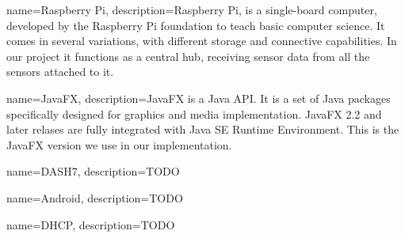 \documentclass[../document]{subfiles}
\begin{document}
{
   name=Raspberry Pi,
   description={Raspberry Pi, is a single-board computer, developed by the Raspberry Pi foundation to teach basic computer science. It comes in several variations, with different storage and connective capabilities. In our project it functions as a central hub, receiving sensor data from all the sensors attached to it.}
}

{
   name=JavaFX,
   description={JavaFX is a Java API. It is a set of Java packages specifically designed for graphics and media implementation. JavaFX 2.2 and later relases are fully integrated with Java SE Runtime Environment. This is the JavaFX version we use in our implementation.}
}

{
   name=DASH7,
   description={TODO}
}

{
   name=Android,
   description={TODO}
}

{
   name=DHCP,
   description={TODO}
}
\end{document}
